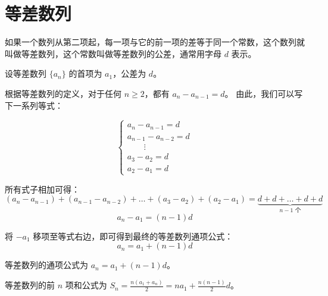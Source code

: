 \newpage

\section{等差数列}

\begin{definition}
    如果一个数列从第二项起，每一项与它的前一项的差等于同一个常数，这个数列就叫做等差数列，这个常数叫做等差数列的公差，通常用字母 $d$ 表示。

    \begin{tips}
        设等差数列 $\{a_n\}$ 的首项为 $a_1$，公差为 $d$。

        根据等差数列的定义，对于任何 $n \geq 2$，都有 $a_n - a_{n-1} = d$。
        由此，我们可以写下一系列等式：

        $$
            \begin{cases}
                a_n - a_{n-1} = d     \\
                a_{n-1} - a_{n-2} = d \\
                \qquad \vdots         \\
                a_3 - a_2 = d         \\
                a_2 - a_1 = d
            \end{cases}
        $$

        所有式子相加可得：
        $$ (a_n - a_{n-1}) + (a_{n-1} - a_{n-2}) + \dots + (a_3 - a_2) + (a_2 - a_1) =  \underbrace{d + d + \dots + d + d}_{n-1 \text{ 个}} $$
        $$ a_n - a_1 = (n-1)d $$

        将 $-a_1$ 移项至等式右边，即可得到最终的等差数列通项公式：
        $$ a_n = a_1 + (n-1)d $$
    \end{tips}

\end{definition}

\begin{theorem}
    等差数列的通项公式为 $a_n = a_1 + (n-1)d$。

    等差数列的前 $n$ 项和公式为 $S_n = \frac{n(a_1+a_n)}{2} = na_1 + \frac{n(n-1)}{2}d$。
\end{theorem}

